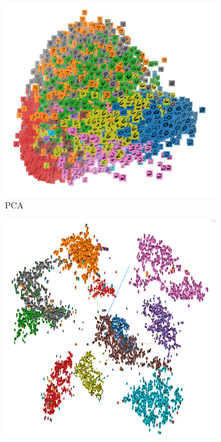 \begin{figure}
\centering
\begin{subfigure}{0.3\textwidth}
  \centering
  \includegraphics[width=1.0\textwidth]{4/pca.png}
  \caption{PCA}
\end{subfigure}
\hspace{0.02\textwidth}
\begin{subfigure}{0.3\textwidth}
  \centering
  \includegraphics[width=1.\textwidth]{4/tsne.png}

\end{subfigure}
\end{figure}
